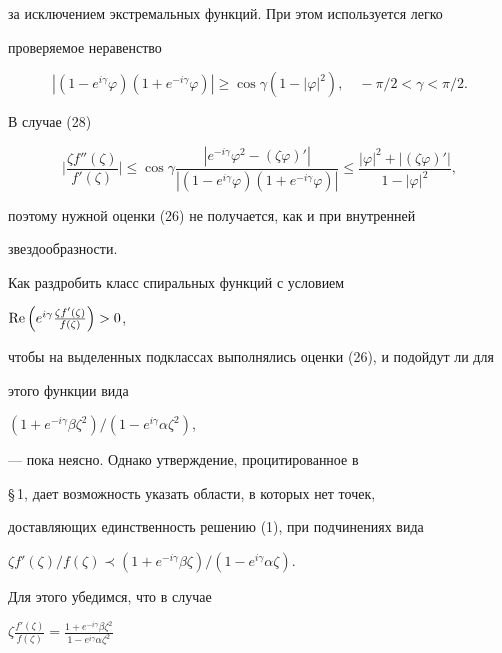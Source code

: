 за исключением экстремальных функций. При этом используется легко


проверяемое неравенство


$$


|(1-e^{i\gamma}\varphi)(1+e^{-i\gamma}\varphi)|\ge


\cos\gamma(1-|\varphi|^2),\quad -\pi/2<\gamma<\pi/2.


$$





В случае (28)


$$


\biggl|\frac{\zeta f''(\zeta)}{f'(\zeta)}\biggr|\le


\cos\gamma


\frac{|e^{-i\gamma}\varphi^2-(\zeta\varphi)'|}


{|(1-e^{i\gamma}\varphi)(1+e^{-i\gamma}\varphi)|}\le


\frac{|\varphi|^2+|(\zeta\varphi)'|}{1-|\varphi|^2},


$$


поэтому нужной оценки (26) не получается, как и при внутренней


звездообразности.





Как раздробить класс спиральных функций с условием


$\operatorname{Re}\left(e^{i\gamma}\frac{\zeta f'(\zeta)}{f(\zeta)}\right)>0$,


чтобы на выделенных подклассах выполнялись оценки (26), и подойдут ли для


этого функции вида


$(1+e^{-i\gamma}\beta\zeta^2)/(1-e^{i\gamma}\alpha\zeta^2)$,


--- пока неясно. Однако утверждение, процитированное в


\S\,1, дает возможность указать области, в которых нет точек,


доставляющих единственность решению (1), при подчинениях вида


$\zeta f'(\zeta)/f(\zeta)\prec(1+e^{-i\gamma}\beta\zeta)/


(1-e^{i\gamma}\alpha\zeta)$.





Для этого убедимся, что в случае


$\zeta\frac{f'(\zeta)}{f(\zeta)}=


\frac{1+e^{-i\gamma}\beta\zeta^2}{1-e^{i\gamma}\alpha\zeta^2}$


